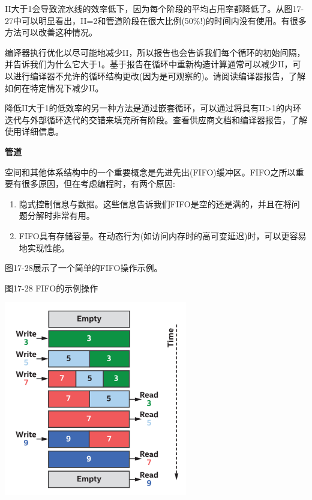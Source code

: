 II大于1会导致流水线的效率低下，因为每个阶段的平均占用率都降低了。从图17-27中可以明显看出，II=2和管道阶段在很大比例(50\%!)的时间内没有使用。有很多方法可以改善这种情况。\par

编译器执行优化以尽可能地减少II，所以报告也会告诉我们每个循环的初始间隔，并告诉我们为什么它大于1。基于报告在循环中重新构造计算通常可以减少II，可以进行编译器不允许的循环结构更改(因为是可观察的)。请阅读编译器报告，了解如何在特定情况下减少II。\par

降低II大于1的低效率的另一种方法是通过嵌套循环，可以通过将具有II>1的内环迭代与外部循环迭代的交错来填充所有阶段。查看供应商文档和编译器报告，了解使用详细信息。\par

\hspace*{\fill} \par %
\textbf{管道}

空间和其他体系结构中的一个重要概念是先进先出(FIFO)缓冲区。FIFO之所以重要有很多原因，但在考虑编程时，有两个原因:\par

\begin{enumerate}
	\item 隐式控制信息与数据。这些信息告诉我们FIFO是空的还是满的，并且在将问题分解时非常有用。
	\item FIFO具有存储容量。在动态行为(如访问内存时的高可变延迟)时，可以更容易地实现性能。
\end{enumerate}

图17-28展示了一个简单的FIFO操作示例。\par

\hspace*{\fill} \par %
图17-28 FIFO的示例操作
\begin{center}
	\includegraphics[width=0.6\textwidth]{content/chapter-17/images/23}
\end{center}


